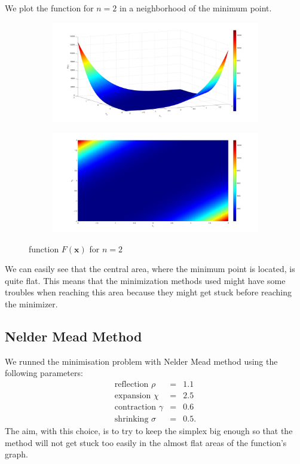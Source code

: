 We plot the function for $n=2$ in a neighborhood of the minimum point.
\begin{figure}[H]
    \centering
    \begin{subfigure}{0.45\textwidth}
        \centering
        \includegraphics[width=\textwidth]{img/function_pb75_angolo1.jpg}
        \caption{}
    \end{subfigure}
    \begin{subfigure}{0.45\textwidth}
        \centering
        \includegraphics[width=\textwidth]{img/function_pb75_angolo2.jpg}
        \caption{}
    \end{subfigure}
    \caption{function $F(\boldsymbol{x})$ for $n=2$}
\end{figure}
We can easily see that the central area, where the minimum point is located,
is quite flat. This means that the minimization methods used might have some troubles
when reaching this area because they might get stuck before reaching the minimizer.

\subsection*{Nelder Mead Method}
We runned the minimisation problem with Nelder Mead method using the following parameters:
\begin{eqnarray*}
    \text{reflection } \rho &=& 1.1 \\
    \text{expansion } \chi &=& 2.5 \\
    \text{contraction } \gamma &=& 0.6 \\
    \text{shrinking } \sigma &=& 0.5.
\end{eqnarray*}
The aim, with this choice, is to try to keep the simplex big enough so that
the method will not get stuck too easily in the almost flat areas of the function's graph.

